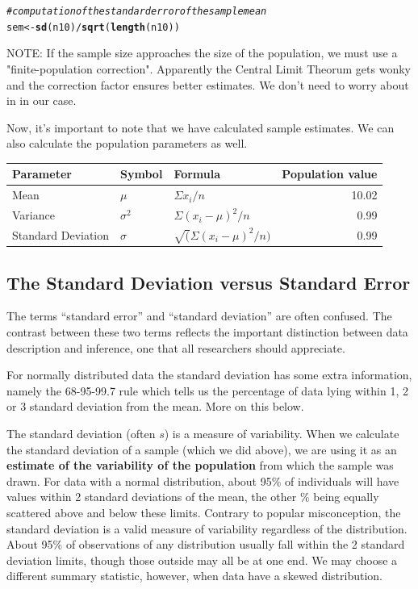 \documentclass{tufte-handout}\usepackage[]{graphicx}\usepackage[]{color}
\makeatletter
\newcommand{\hlcom}[1]{\textcolor[rgb]{0.678,0.584,0.686}{\textit{#1}}}%
\newcommand{\hlopt}[1]{\textcolor[rgb]{0,0,0}{#1}}%
\newcommand{\hlstd}[1]{\textcolor[rgb]{0.345,0.345,0.345}{#1}}%
\newcommand{\hlkwb}[1]{\textcolor[rgb]{0.69,0.353,0.396}{#1}}%
\newcommand{\hlkwd}[1]{\textcolor[rgb]{0.737,0.353,0.396}{\textbf{#1}}}%
\newenvironment{kframe}{%
 \def\at@end@of@kframe{}%
 \ifinner\ifhmode%
  \def\at@end@of@kframe{\end{minipage}}%
  \begin{minipage}{\columnwidth}%
 \fi\fi%
 \def\FrameCommand##1{\hskip\@totalleftmargin \hskip-\fboxsep
 \colorbox{shadecolor}{##1}\hskip-\fboxsep
     \hskip-\linewidth \hskip-\@totalleftmargin \hskip\columnwidth}%
 \MakeFramed {\advance\hsize-\width
   \@totalleftmargin\z@ \linewidth\hsize
   \@setminipage}}%
 {\par\unskip\endMakeFramed%
 \at@end@of@kframe}
\newenvironment{knitrout}{}{} %
\makeatother
\begin{document}
\begin{knitrout}
\color{fgcolor}\begin{kframe}
\begin{alltt}
\hlcom{#computation of the standard error of the sample mean}
\hlstd{sem}\hlkwb{<-}\hlkwd{sd}\hlstd{(n10)}\hlopt{/}\hlkwd{sqrt}\hlstd{(}\hlkwd{length}\hlstd{(n10))}
\end{alltt}
\end{kframe}
\end{knitrout}

NOTE: If the sample size approaches the size of the population, we must use a "finite-population correction". Apparently the Central Limit Theorum gets wonky and the correction factor ensures better estimates. We don't need to worry about in in our case.

Now, it's important to note that we have calculated sample estimates. We can also calculate the population parameters as well.

\begin{table}
\begin{tabular}{lllr}
Parameter    &  Symbol  & Formula   & Population value \\ \hline\hline
Mean        & $\mu$     & $\Sigma x_i/n$ & 10.02 \\
Variance        & $\sigma^2$     & $\Sigma(x_i-\mu)^2/n$ & 0.99 \\
Standard Deviation        & $\sigma$     & $\sqrt(\Sigma(x_i-\mu)^2/n)$ & 0.99 \\
\hline
\end{tabular}
\end{table}

\subsection{The Standard Deviation versus Standard Error}

The terms ``standard error'' and ``standard deviation'' are often confused. The contrast between these two terms reflects the important distinction between data description and inference, one that all researchers should appreciate.

For normally distributed data the standard deviation has some extra information, namely the 68-95-99.7 rule which tells us the percentage of data lying within 1, 2 or 3 standard deviation from the mean. More on this below.

The standard deviation (often $s$) is a measure of variability. When we calculate the standard deviation of a sample (which we did above), we are using it as an \textbf{estimate of the variability of the population} from which the sample was drawn. For data with a normal distribution, about 95\% of individuals will have values within 2 standard deviations of the mean, the other \% being equally scattered above and below these limits. Contrary to popular misconception, the standard deviation is a valid measure of variability regardless of the distribution. About 95\% of observations of any distribution usually fall within the 2 standard deviation limits, though those outside may all be at one end. We may choose a different summary statistic, however, when data have a skewed distribution.
\end{document}
